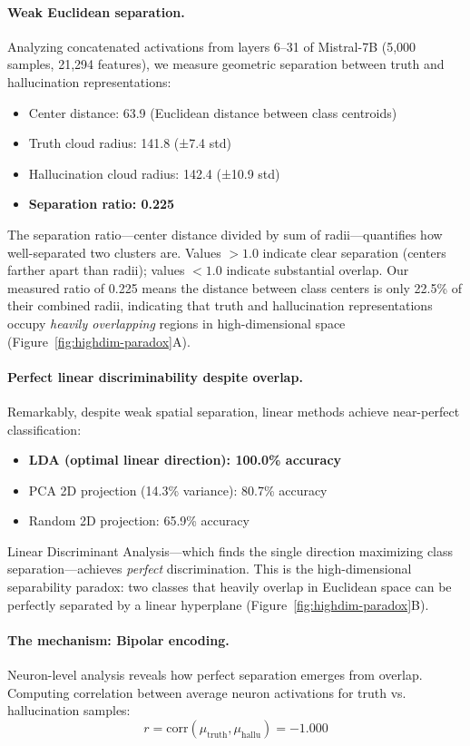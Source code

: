 \documentclass[11pt]{article}
\begin{document}
\paragraph{Weak Euclidean separation.} 
Analyzing concatenated activations from layers 6--31 of Mistral-7B (5,000 samples, 21,294 features), we measure geometric separation between truth and hallucination representations:
\begin{itemize}
\item Center distance: 63.9 (Euclidean distance between class centroids)
\item Truth cloud radius: 141.8 (±7.4 std)
\item Hallucination cloud radius: 142.4 (±10.9 std)
\item \textbf{Separation ratio: 0.225}
\end{itemize}

The separation ratio---center distance divided by sum of radii---quantifies how well-separated two clusters are. Values $> 1.0$ indicate clear separation (centers farther apart than radii); values $< 1.0$ indicate substantial overlap. Our measured ratio of 0.225 means the distance between class centers is only 22.5\% of their combined radii, indicating that truth and hallucination representations occupy \textit{heavily overlapping} regions in high-dimensional space (Figure~\ref{fig:highdim-paradox}A).

\paragraph{Perfect linear discriminability despite overlap.} 
Remarkably, despite weak spatial separation, linear methods achieve near-perfect classification:
\begin{itemize}
\item \textbf{LDA (optimal linear direction): 100.0\% accuracy}
\item PCA 2D projection (14.3\% variance): 80.7\% accuracy
\item Random 2D projection: 65.9\% accuracy
\end{itemize}

Linear Discriminant Analysis---which finds the single direction maximizing class separation---achieves \textit{perfect} discrimination. This is the high-dimensional separability paradox: two classes that heavily overlap in Euclidean space can be perfectly separated by a linear hyperplane (Figure~\ref{fig:highdim-paradox}B).

\paragraph{The mechanism: Bipolar encoding.}
Neuron-level analysis reveals how perfect separation emerges from overlap. Computing correlation between average neuron activations for truth vs. hallucination samples:
\begin{equation}
r = \text{corr}(\mu_{\text{truth}}, \mu_{\text{hallu}}) = -1.000
\end{equation}
\end{document}

